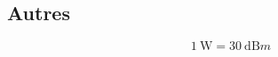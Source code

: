 \documentclass[resume]{subfiles}
\begin{document}
\subsection{Autres}
$$\SI{1}{\watt}=\SI{30}{\deci\bel m}$$
\end{document}
